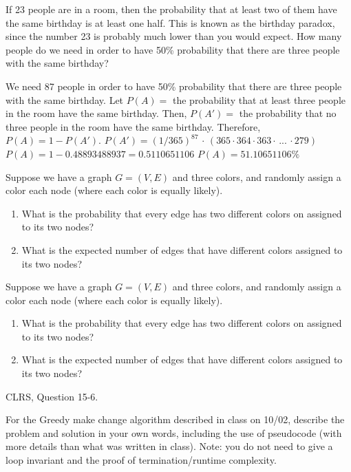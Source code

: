 \documentclass{article}
\author{Gavin Austin, George Engel, Troy Oster}
\date{due: 18 October 2019}
\begin{document}
\nextprob
If 23 people are in a room, then the probability that at least two of them have
the same birthday is at least one half.  This is known as the birthday paradox,
since the number 23 is probably much lower than you would expect.  How many
people do we need in order to have 50\% probability that there are three people
with the same birthday?

We need 87 people in order to have 50\% probability that there are three people with the same birthday.
\newline \newline Let $P(A) = $ the probability that at least three people in the room have the same birthday.
\newline Then, $P(A') = $ the probability that no three people in the room have the same birthday.
\newline Therefore, $P(A) = 1 - P(A')$.
\newline \newline $P(A') = (1/365)^{87} \,\cdot\, (365 \cdot 364 \cdot 363 \cdot \, ... \, \cdot 279)$
\newline $P(A) = 1 - 0.48893488937 = 0.5110651106$
\newline $P(A) = 51.10651106\%$


\nextprob
Suppose we have a graph $G=(V,E)$ and three colors, and randomly assign a color
each node (where each color is equally likely).
\begin{enumerate}
    \item What is the probability that every edge has two different colors on
        assigned to its two nodes?
    \item What is the expected number of edges that have different colors
        assigned to its two nodes?
\end{enumerate}

\nextprob
Suppose we have a graph $G=(V,E)$ and three colors, and randomly assign a color
each node (where each color is equally likely).
\begin{enumerate}
    \item What is the probability that every edge has two different colors on
        assigned to its two nodes?
    \item What is the expected number of edges that have different colors
        assigned to its two nodes?
\end{enumerate}

\nextprob
CLRS, Question 15-6.

\nextprob
For the Greedy make change algorithm described in class on 10/02, describe the
problem and solution in your own words, including the use of pseudocode (with
more details than what was written in class).  Note: you do not need to give a
loop invariant and the proof of termination/runtime complexity.
\end{document}
